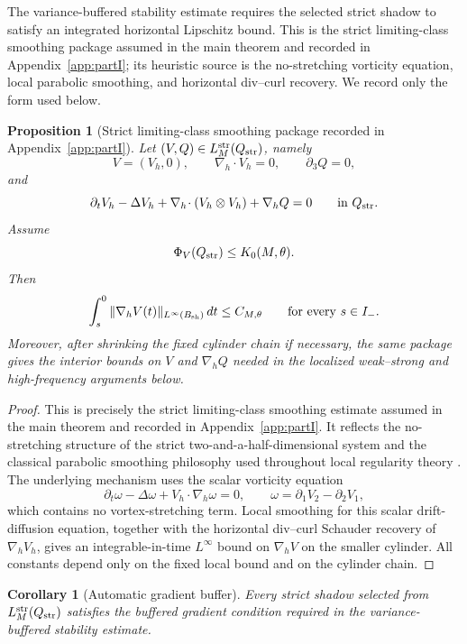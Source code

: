 \documentclass[11pt]{article}
\numberwithin{equation}{section}
\theoremstyle{plain}
\newtheorem{proposition}{Proposition}[section]
\newtheorem{corollary}{Corollary}[section]
\theoremstyle{definition}
\theoremstyle{remark}
\newcommand{\str}{\mathrm{str}}
\newcommand{\nabh}{\nabla_h}
\newcommand{\divh}{\nabla_h\!\cdot}
\begin{document}
The variance-buffered stability estimate requires the selected strict shadow to satisfy an integrated horizontal Lipschitz bound.  This is the strict limiting-class smoothing package assumed in the main theorem and recorded in Appendix~\ref{app:partI}; its heuristic source is the no-stretching vorticity equation, local parabolic smoothing, and horizontal div--curl recovery.  We record only the form used below.

\begin{proposition}[Strict limiting-class smoothing package recorded in Appendix~\ref{app:partI}]\label{pII:prop:strict-smoothing-package}
Let \((V,Q)\in L_M^{\str}(Q_{\rm str})\), namely
\[
        V=(V_h,0),\qquad \divh V_h=0,\qquad \partial_3Q=0,
\]
and
\[
        \partial_tV_h-\Delta V_h+\divh(V_h\otimes V_h)+\nabh Q=0
        \qquad\text{in }Q_{\rm str}.
\]
Assume
\[
        \Phi_V(Q_{\rm str})\le K_0(M,\theta).
\]
Then
\[
        \int_s^0\|\nabh V(t)\|_{L^\infty(B_{\rm sh})}\,dt\le C_{M,\theta}
        \qquad\text{for every }s\in I_-.
\]
Moreover, after shrinking the fixed cylinder chain if necessary, the same package gives the interior bounds on \(V\) and \(\nabh Q\) needed in the localized weak--strong and high-frequency arguments below.
\end{proposition}

\begin{proof}
This is precisely the strict limiting-class smoothing estimate assumed in the main theorem and recorded in Appendix~\ref{app:partI}.  It reflects the no-stretching structure of the strict two-and-a-half-dimensional system and the classical parabolic smoothing philosophy used throughout local regularity theory \cite{CKN1982,Lin1998,Seregin2015}.  The underlying mechanism uses the scalar vorticity equation
\[
        \partial_t\omega-\Delta\omega+V_h\cdot\nabh\omega=0,
        \qquad \omega=\partial_1V_2-\partial_2V_1,
\]
which contains no vortex-stretching term.  Local smoothing for this scalar drift-diffusion equation, together with the horizontal div--curl Schauder recovery of \(\nabh V_h\), gives an integrable-in-time \(L^\infty\) bound on \(\nabh V\) on the smaller cylinder.  All constants depend only on the fixed local bound and on the cylinder chain.
\end{proof}

\begin{corollary}[Automatic gradient buffer]\label{pII:cor:auto-gradient-buffer}
Every strict shadow selected from \(L_M^{\str}(Q_{\rm str})\) satisfies the buffered gradient condition required in the variance-buffered stability estimate.
\end{corollary}
\end{document}
